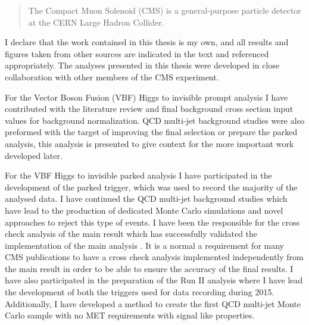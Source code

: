   


\begin{abstract}%
The Compact Muon Solenoid (CMS) is a general-purpose particle detector at the CERN Large Hadron Collider. 


\end{abstract}


\begin{declaration}
I declare that the work contained in this thesis is my own, and all results and figures taken from other sources are indicated in the text and referenced appropriately. The analyses presented in this thesis were developed in close collaboration with other members of the CMS experiment.

For the Vector Boson Fusion (VBF) Higgs to invisible prompt analysis I have contributed with the literature review and final background cross section input values for background normalization. QCD multi-jet background studies were also preformed with the target of improving the final selection or prepare the parked analysis, this analysis is presented to give context for the more important work developed later. 

For the VBF Higgs to invisible parked analysis I have participated in the development of the parked trigger, which was used to record the majority of the analysed data. I have continued the QCD multi-jet background studies which have lead to the production of dedicated Monte Carlo simulations and novel approaches to reject this type of events. I have been the responsible for the cross check analysis of the main result which has successfully validated the implementation of the main analysis \cite{ARTICLE:CMSVBFHiggsInvisibleParkedAnalysisPAS}. It is a normal a requirement for many \gls{CMS} publications to have a cross check analysis implemented independently from the main result in order to be able to ensure the accuracy of the final results. I have also participated in the preparation of the Run II analysis where I have lead the development of both the triggers used for data recording during 2015. Additionally, I have developed a method to create the first QCD multi-jet Monte Carlo sample with no MET requirements with signal like properties.


\end{declaration}
